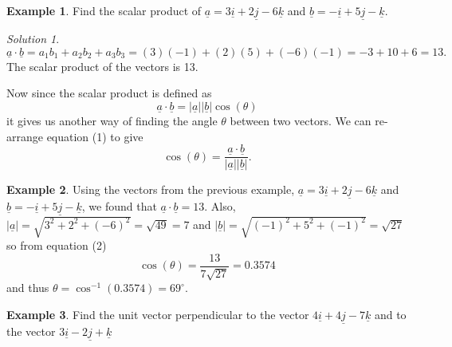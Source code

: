 \documentclass[
  11pt,
  oneside]{book}
\newcommand{\slide}{}
\theoremstyle{definition}
\theoremstyle{definition}
\newtheorem{example}{Example}[chapter]
\theoremstyle{definition}
\theoremstyle{definition}
\theoremstyle{remark}
\newtheorem*{solution}{Solution}
\begin{document}
\begin{example}
Find the scalar product of \(\underline a = 3\underline i + 2\underline j - 6\underline k\) and \(\underline b = -\underline i + 5\underline j - \underline k\).
\end{example}

\begin{solution}
\[
\underline a\cdot\underline b = a_1b_1 + a_2b_2 + a_3b_3 = (3)(-1)+(2)(5)+(-6)(-1) = -3+10+6=13.
\]
The scalar product of the vectors is 13.
\end{solution}

Now since the scalar product is defined as
\[
\underline a \cdot\underline b = |\underline a||\underline b| \cos(\theta)\tag{1}
\]
it gives us another way of finding the angle \(\theta\) between two vectors. We can re-arrange equation (1) to give
\[
\cos(\theta) = \frac{\underline a\cdot\underline b}{|\underline a||\underline b|}.\tag{2}
\]
\slide

\begin{example}
Using the vectors from the previous example, \(\underline a = 3\underline i + 2\underline j - 6\underline k\) and \(\underline b = -\underline i + 5\underline j - \underline k\), we found that \(\underline a\cdot\underline b = 13\).
Also, \(|\underline a| = \sqrt{3^2+2^2+(-6)^2}=\sqrt{49}=7\) and \(|\underline b| = \sqrt{(-1)^2+5^2+(-1)^2} = \sqrt{27}\) so from equation (2)
\[
\cos(\theta) = \frac{13}{7\sqrt{27}} = 0.3574
\]
and thus \(\theta = \cos^{-1}(0.3574) = 69^\circ\).
\end{example}

\slide

\begin{example}
Find the unit vector perpendicular to the vector \(4\underline i+4\underline j-7\underline k\) and to the vector \(3\underline i - 2\underline j+\underline k\)
\end{example}
\end{document}
